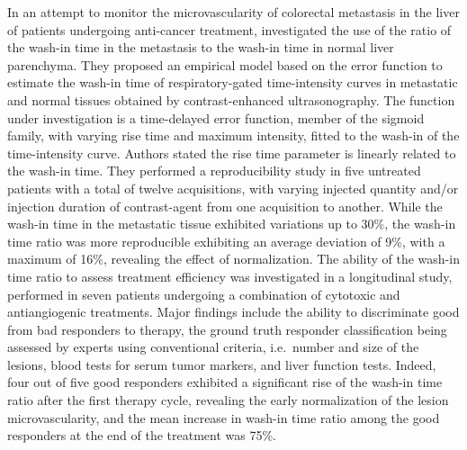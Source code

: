 In an attempt to monitor the microvascularity of colorectal metastasis in the liver of patients undergoing anti-cancer treatment, \citet{Averkiou:2010iw} investigated the use of the ratio of the wash-in time in the metastasis to the wash-in time in normal liver parenchyma.
They proposed an empirical model based on the error function to estimate the wash-in time of respiratory-gated time-intensity curves in metastatic and normal tissues obtained by contrast-enhanced ultrasonography.
The function under investigation is a time-delayed error function, member of the sigmoid family, with varying rise time and maximum intensity, fitted to the wash-in of the time-intensity curve.
Authors stated the rise time parameter is linearly related to the wash-in time.
They performed a reproducibility study in five untreated patients with a total of twelve acquisitions, with varying injected quantity and/or injection duration of contrast-agent from one acquisition to another.
While the wash-in time in the metastatic tissue exhibited variations up to 30\%, the wash-in time ratio was more reproducible exhibiting an average deviation of 9\%, with a maximum of 16\%, revealing the effect of normalization.
The ability of the wash-in time ratio to assess treatment efficiency was investigated in a longitudinal study, performed in seven patients undergoing a combination of cytotoxic and antiangiogenic treatments.
Major findings include the ability to discriminate good from bad responders to therapy, the ground truth responder classification being assessed by experts using conventional criteria, i.e.~number and size of the lesions, blood tests for serum tumor markers, and liver function tests.
Indeed, four out of five good responders exhibited a significant rise of the wash-in time ratio after the first therapy cycle, revealing the early normalization of the lesion microvascularity, and the mean increase in wash-in time ratio among the good responders at the end of the treatment was 75\%.

